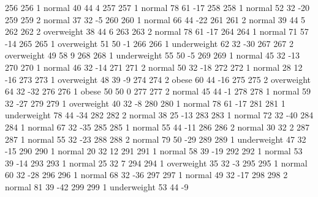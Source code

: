 \begin{Schunk}
\begin{Soutput}
256         256   1      normal  40         44            4
257         257   1      normal  78         61          -17
258         258   1      normal  52         32          -20
259         259   2      normal  37         32           -5
260         260   1      normal  66         44          -22
261         261   2      normal  39         44            5
262         262   2  overweight  38         44            6
263         263   2      normal  78         61          -17
264         264   1      normal  71         57          -14
265         265   1  overweight  51         50           -1
266         266   1 underweight  62         32          -30
267         267   2  overweight  49         58            9
268         268   1 underweight  55         50           -5
269         269   1      normal  45         32          -13
270         270   1      normal  46         32          -14
271         271   2      normal  50         32          -18
272         272   1      normal  28         12          -16
273         273   1  overweight  48         39           -9
274         274   2       obese  60         44          -16
275         275   2  overweight  64         32          -32
276         276   1       obese  50         50            0
277         277   2      normal  45         44           -1
278         278   1      normal  59         32          -27
279         279   1  overweight  40         32           -8
280         280   1      normal  78         61          -17
281         281   1 underweight  78         44          -34
282         282   2      normal  38         25          -13
283         283   1      normal  72         32          -40
284         284   1      normal  67         32          -35
285         285   1      normal  55         44          -11
286         286   2      normal  30         32            2
287         287   1      normal  55         32          -23
288         288   2      normal  79         50          -29
289         289   1 underweight  47         32          -15
290         290   1      normal  20         32           12
291         291   1      normal  58         39          -19
292         292   1      normal  53         39          -14
293         293   1      normal  25         32            7
294         294   1  overweight  35         32           -3
295         295   1      normal  60         32          -28
296         296   1      normal  68         32          -36
297         297   1      normal  49         32          -17
298         298   2      normal  81         39          -42
299         299   1 underweight  53         44           -9

\end{Soutput}
\end{Schunk}

